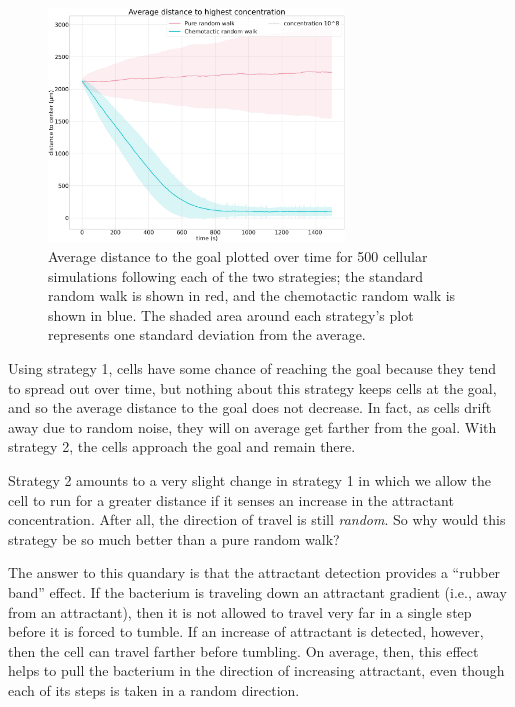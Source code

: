 \begin{figure}[h]
\centering
\mySfFamily
\includegraphics[width = 0.7\textwidth]{../images/chemotaxis_performance_compare_uniform.png}
\caption{Average distance to the goal plotted over time for 500 cellular simulations following each of the two strategies; the standard random walk is shown in red, and the chemotactic random walk is shown in blue. The shaded area around each strategy's plot represents one standard deviation from the average.}
\label{fig:chemotaxis_performance_compare_uniform}
\end{figure}


Using strategy 1, cells have some chance of reaching the goal because they tend to spread out over time, but nothing about this strategy keeps cells at the goal, and so the average distance to the goal does not decrease. In fact, as cells drift away due to random noise, they will on average get farther from the goal. With strategy 2, the cells approach the goal and remain there.

Strategy 2 amounts to a very slight change in strategy 1 in which we allow the cell to run for a greater distance if it senses an increase in the attractant concentration. After all, the direction of travel is still \textit{random}. So why would this strategy be so much better than a pure random walk?

The answer to this quandary is that the attractant detection provides a ``rubber band'' effect. If the bacterium is traveling down an attractant gradient (i.e., away from an attractant), then it is not allowed to travel very far in a single step before it is forced to tumble. If an increase of attractant is detected, however, then the cell can travel farther before tumbling. On average, then, this effect helps to pull the bacterium in the direction of increasing attractant, even though each of its steps is taken in a random direction.


